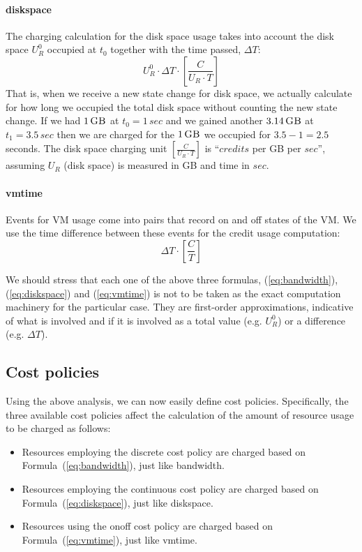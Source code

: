 \documentclass[letterpaper,twocolumn,10pt]{article}
\newcommand{\GB}[1]{\ensuremath{#1\,\mbox{\sc GB}}}
\newcommand{\secs}[1]{\ensuremath{#1\,sec}}
\begin{document}
\paragraph{\textsf{diskspace}}
The charging calculation for the disk space usage takes into account the disk space $U_R^0$ occupied at $t_0$ together with the time passed, $\Delta T$:
\begin{equation}
\label{eq:diskspace}
U_R^{0} \cdot \Delta T \cdot [ \frac{C}{U_R \cdot T} ]
\end{equation}
That is, when we receive a new state change for disk space, we actually calculate for how long we occupied the total disk space without counting the new state change. If we had \GB{1} at $t_0 = \secs{1}$ and we gained another \GB{3.14} at $t_1 = \secs{3.5}$ then we are charged for the \GB{1} we occupied for $3.5 - 1 = 2.5$ seconds. The disk space charging unit $[ \frac{C}{U_R \cdot T} ]$ is ``$credits$ per {\sc GB} per $sec$'', assuming $U_R$ (disk space) is measured in {\sc GB} and time in $sec$.


\paragraph{\textsf{vmtime}}
Events for VM usage come into pairs that record \textsf{on} and \textsf{off} states of the VM. We use the time difference between these events for the credit usage computation:
\begin{equation}
\label{eq:vmtime}
\Delta T \cdot [ \frac{C}{T} ]
\end{equation}

We should stress that each one of the above three formulas, (\ref{eq:bandwidth}), (\ref{eq:diskspace}) and (\ref{eq:vmtime}) is not to be taken as the exact computation machinery for the particular case. They are first-order approximations, indicative of what is involved and if it is involved as a total value (e.g. $U_R^0$) or a difference (e.g. $\Delta T$).


\subsection{Cost policies}
Using the above analysis, we can now easily define cost policies. Specifically, the three available cost policies affect the calculation 
of the amount of resource usage to be charged as follows:

\begin{itemize}
    \item Resources employing the \textsf{discrete} cost policy  are charged based on Formula~(\ref{eq:bandwidth}), just like \textsf{bandwidth}. 

    \item Resources employing the \textsf{continuous} cost policy are charged based on Formula~(\ref{eq:diskspace}), just like \textsf{diskspace}.

    \item Resources using the \textsf{onoff} cost policy are charged based on Formula~(\ref{eq:vmtime}), just like \textsf{vmtime}.
\end{itemize}
\end{document}
